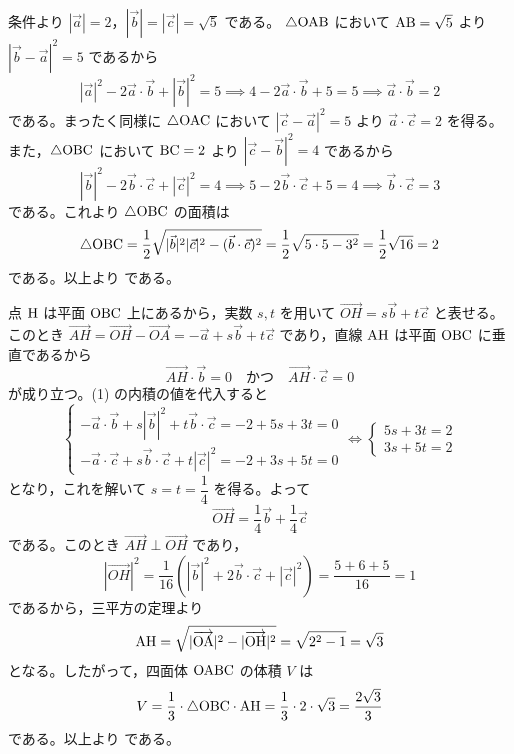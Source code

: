 
条件より $|\vec{a}|=2$，$|\vec{b}|=|\vec{c}|=\sqrt{5}$ である。
$\triangle\mathrm{OAB}$ において $\mathrm{AB}=\sqrt{5}$ より $|\vec{b}-\vec{a}|^{2}=5$ であるから
\[
  |\vec{a}|^{2}-2\vec{a}\cdot\vec{b}+|\vec{b}|^{2}=5 \implies 4-2\vec{a}\cdot\vec{b}+5=5 \implies \vec{a}\cdot\vec{b}=2
\]
である。まったく同様に $\triangle\mathrm{OAC}$ において $|\vec{c}-\vec{a}|^{2}=5$ より $\vec{a}\cdot\vec{c}=2$ を得る。
また，$\triangle\mathrm{OBC}$ において $\mathrm{BC}=2$ より $|\vec{c}-\vec{b}|^{2}=4$ であるから
\[
  |\vec{b}|^{2}-2\vec{b}\cdot\vec{c}+|\vec{c}|^{2}=4 \implies 5-2\vec{b}\cdot\vec{c}+5=4 \implies \vec{b}\cdot\vec{c}=3
\]
である。これより $\triangle\mathrm{OBC}$ の面積は
\[
  \triangle\mathrm{OBC}=\frac{1}{2}\sqrt{|\vec{b}|^{2}|\vec{c}|^{2}-(\vec{b}\cdot\vec{c})^{2}}
  =\frac{1}{2}\sqrt{5\cdot 5-3^{2}}=\frac{1}{2}\sqrt{16}=2
\]
である。以上より
である。

点 $\mathrm{H}$ は平面 $\mathrm{OBC}$ 上にあるから，実数 $s, t$ を用いて $\Vec{OH}=s\vec{b}+t\vec{c}$ と表せる。
このとき $\Vec{AH}=\Vec{OH}-\Vec{OA}=-\vec{a}+s\vec{b}+t\vec{c}$ であり，直線 $\mathrm{AH}$ は平面 $\mathrm{OBC}$ に垂直であるから
\[
  \Vec{AH}\cdot\vec{b}=0 \quad\text{かつ}\quad \Vec{AH}\cdot\vec{c}=0
\]
が成り立つ。(1) の内積の値を代入すると
\[
  \begin{cases}
    -\vec{a}\cdot\vec{b}+s|\vec{b}|^{2}+t\vec{b}\cdot\vec{c}=-2+5s+3t=0 \\[2pt]
    -\vec{a}\cdot\vec{c}+s\vec{b}\cdot\vec{c}+t|\vec{c}|^{2}=-2+3s+5t=0
  \end{cases}
  \iff
  \begin{cases}
    5s+3t=2 \\[2pt]
    3s+5t=2
  \end{cases}
\]
となり，これを解いて $s=t=\dfrac{1}{4}$ を得る。よって
\[
  \Vec{OH}=\frac{1}{4}\vec{b}+\frac{1}{4}\vec{c}
\]
である。このとき $\Vec{AH}\perp\Vec{OH}$ であり，
\[
  |\Vec{OH}|^{2}=\frac{1}{16}\left(|\vec{b}|^{2}+2\vec{b}\cdot\vec{c}+|\vec{c}|^{2}\right)=\frac{5+6+5}{16}=1
\]
であるから，三平方の定理より
\[
  \mathrm{AH}=\sqrt{|\overrightarrow{\mathrm{OA}}|^{2}-|\overrightarrow{\mathrm{OH}}|^{2}}=\sqrt{2^{2}-1}=\sqrt{3}
\]
となる。したがって，四面体 $\mathrm{OABC}$ の体積 $V$ は
\[
  V=\frac{1}{3}\cdot\triangle\mathrm{OBC}\cdot\mathrm{AH}=\frac{1}{3}\cdot 2\cdot\sqrt{3}=\frac{2\sqrt{3}}{3}
\]
である。以上より
である。

